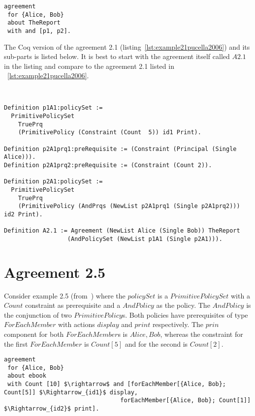 \lstset{language=Pucella2006}
\begin{lstlisting}[frame=single, caption={Agreement 2.1 (as used in~\cite{pucella2006})},label={lst:example21pucella2006}]
agreement
 for {Alice, Bob} 
 about TheReport 
 with and [p1, p2].
\end{lstlisting}

The Coq version of the agreement 2.1 (listing~\ref{lst:example21pucella2006}) and its sub-parts is listed below. It is best to start with the agreement itself called $A2.1$ in the listing and compare to the agreement 2.1 listed in ~\ref{lst:example21pucella2006}.

\lstset{language=Coq}
\begin{minipage}[c]{0.95\textwidth}
\begin{lstlisting}[frame=single, caption={Agreement 2.1 in Coq},label={lst:example21}]


Definition p1A1:policySet :=
  PrimitivePolicySet
    TruePrq
    (PrimitivePolicy (Constraint (Count  5)) id1 Print).

Definition p2A1prq1:preRequisite := (Constraint (Principal (Single Alice))).
Definition p2A1prq2:preRequisite := (Constraint (Count 2)).

Definition p2A1:policySet :=
  PrimitivePolicySet
    TruePrq
    (PrimitivePolicy (AndPrqs (NewList p2A1prq1 (Single p2A1prq2))) id2 Print).

Definition A2.1 := Agreement (NewList Alice (Single Bob)) TheReport
                  (AndPolicySet (NewList p1A1 (Single p2A1))).

\end{lstlisting}                  
\end{minipage}

\section{Agreement 2.5}

Consider example 2.5 (from~\cite{pucella2006}) where the $policySet$ is a $PrimitivePolicySet$ with a $Count$ constraint as prerequisite and a $AndPolicy$ as the policy. The $AndPolicy$ is the conjunction of two $PrimitivePolicy$s. Both policies have prerequisites of type $ForEachMember$ with actions $display$ and $print$ respectively. The $prin$ component for both $ForEachMember$s is ${Alice, Bob}$, whereas the constraint for the first $ForEachMember$ is $Count[5]$ and for the second is $Count[2]$.

\lstset{language=Pucella2006}
\begin{lstlisting}[frame=single, caption={Agreement 2.5 (as used in~\cite{pucella2006})},label={lst:example25pucella2006}]
agreement
 for {Alice, Bob} 
 about ebook 
 with Count [10] $\rightarrow$ and [forEachMember[{Alice, Bob}; Count[5]] $\Rightarrow_{id1}$ display,
                                 forEachMember[{Alice, Bob}; Count[1]] $\Rightarrow_{id2}$ print].
\end{lstlisting}

